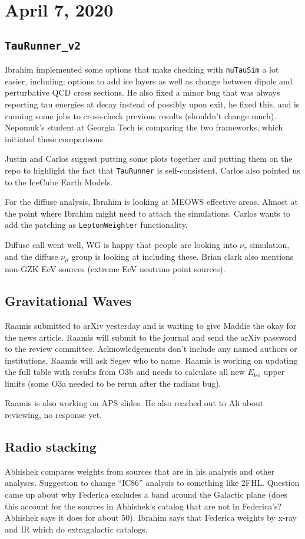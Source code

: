 \chapter{April 7, 2020}
\section{\texttt{TauRunner\_v2}}
Ibrahim implemented some options that make checking with \texttt{nuTauSim} a lot easier, including: options to add ice layers as well as change between dipole and perturbative QCD cross sections. He also fixed a minor bug that was always reporting tau energies at decay instead of possibly upon exit, he fixed this, and is running some jobs to cross-check previous results (shouldn't change much). Nepomuk's student at Georgia Tech is comparing the two frameworks, which initiated these comparisons. 

Justin and Carlos suggest putting some plots together and putting them on the repo to highlight the fact that \texttt{TauRunner} is self-consistent. Carlos also pointed us to the IceCube Earth Models.

For the diffuse analysis, Ibrahim is looking at MEOWS effective areas. Almost at the point where Ibrahim might need to attach the simulations. Carlos wants to add the patching as \texttt{LeptonWeighter} functionality. 

Diffuse call went well, WG is happy that people are looking into $\nu_{\tau}$ simulation, and the diffuse $\nu_{\mu}$ group is looking at including these. Brian clark also mentions non-GZK EeV sources (extreme EeV neutrino point sources). 

\section{Gravitational Waves}
Raamis submitted to arXiv yesterday and is waiting to give Maddie the okay for the news article. Raamis will submit to the journal and send the arXiv password to the review committee. Acknowledgements don't include any named authors or institutions, Raamis will ask Segev who to name. Raamis is working on updating the full table with results from O3b and needs to calculate all new $E_{\mathrm{iso}}$ upper limits (some O3a needed to be rerun after the radians bug).

Raamis is also working on APS slides. He also reached out to Ali about reviewing, no response yet.

\section{Radio stacking}
Abhishek compares weights from sources that are in his analysis and other analyses. Suggestion to change ``IC86'' analysis to something like 2FHL. Question came up about why Federica excludes a band around the Galactic plane (does this account for the sources in Abhishek's catalog that are not in Federica's? Abhishek says it does for about 50). Ibrahim says that Federica weights by x-ray and IR which do extragalactic catalogs.

